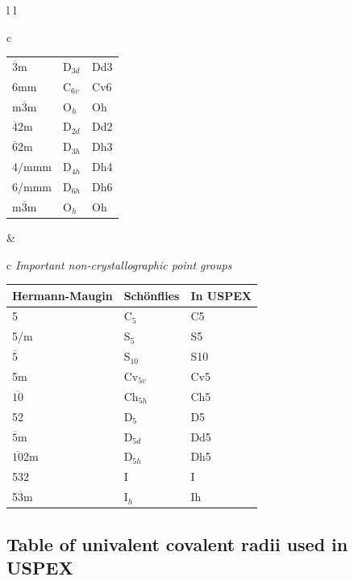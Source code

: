 \documentclass[12pt]{article}
\begin{document}
\begin{tabular}{ l l }
\begin{tabular}{c}
{\begin{tabular}{|l|l|l|}
$\overline{3}$m  & D$_{3d}$     & Dd3      \\
6mm              & C$_{6v}$     & Cv6      \\
m$\overline{3}$m & O$_h$        & Oh       \\
$\overline{4}$2m & D$_{2d}$     & Dd2      \\
$\overline{6}$2m & D$_{3h}$     & Dh3      \\
4/mmm            & D$_{4h}$     & Dh4      \\
6/mmm            & D$_{6h}$     & Dh6      \\
m$\overline{3}$m & O$_h$        & Oh       \\
\hline
\end{tabular}
}
\end{tabular}

&

\begin{tabular}{c}
\emph{Important non-crystallographic point groups} \\

{\footnotesize
\begin{tabular}{|l|l|l|}
\hline
Hermann-Maugin    & Sch\"onflies & In USPEX \\
\hline
5                 & C$_5$        & C5       \\
5/m               & S$_5$        & S5       \\
$\overline{5}$    & S$_{10}$     & S10      \\
5m                & Cv$_{5v}$    & Cv5      \\
$\overline{10}$   & Ch$_{5h}$    & Ch5      \\
52                & D$_5$        & D5       \\
$\overline{5}$m   & D$_{5d}$     & Dd5      \\
$\overline{10}$2m & D$_{5h}$     & Dh5      \\
532               & I            & I        \\
5$\overline{3}$m  & I$_h$        & Ih       \\
\hline
\end{tabular}
}
\end{tabular}

\end{tabular}
\newpage
\subsection{Table of univalent covalent radii used in USPEX}
\label{appendix_radii}
\end{document}
